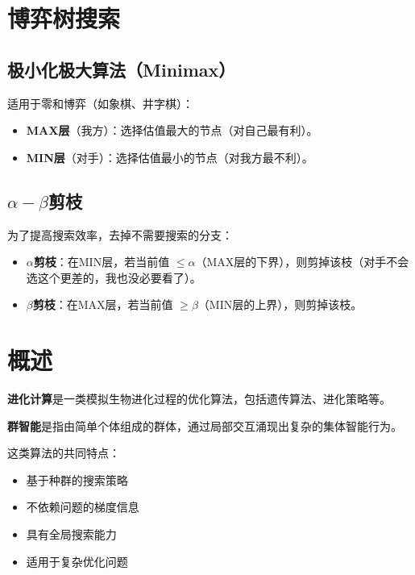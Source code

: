 \section{博弈树搜索}

\subsection{极小化极大算法（Minimax）}
适用于零和博弈（如象棋、井字棋）：
\begin{itemize}[leftmargin=2em,itemsep=0pt]
    \item \textbf{MAX层}（我方）：选择估值最大的节点（对自己最有利）。
    \item \textbf{MIN层}（对手）：选择估值最小的节点（对我方最不利）。
\end{itemize}

\subsection{\texorpdfstring{$\alpha-\beta$}{alpha-beta}剪枝}
为了提高搜索效率，去掉不需要搜索的分支：
\begin{itemize}[leftmargin=2em,itemsep=0pt]
    \item \textbf{$\alpha$剪枝}：在MIN层，若当前值 $\le \alpha$（MAX层的下界），则剪掉该枝（对手不会选这个更差的，我也没必要看了）。
    \item \textbf{$\beta$剪枝}：在MAX层，若当前值 $\ge \beta$（MIN层的上界），则剪掉该枝。
\end{itemize}


\section{概述}

\begin{conceptbox}
\textbf{进化计算}是一类模拟生物进化过程的优化算法，包括遗传算法、进化策略等。

\textbf{群智能}是指由简单个体组成的群体，通过局部交互涌现出复杂的集体智能行为。
\end{conceptbox}

这类算法的共同特点：
\begin{itemize}[leftmargin=2em,itemsep=0pt]
    \item 基于种群的搜索策略
    \item 不依赖问题的梯度信息
    \item 具有全局搜索能力
    \item 适用于复杂优化问题
\end{itemize}

